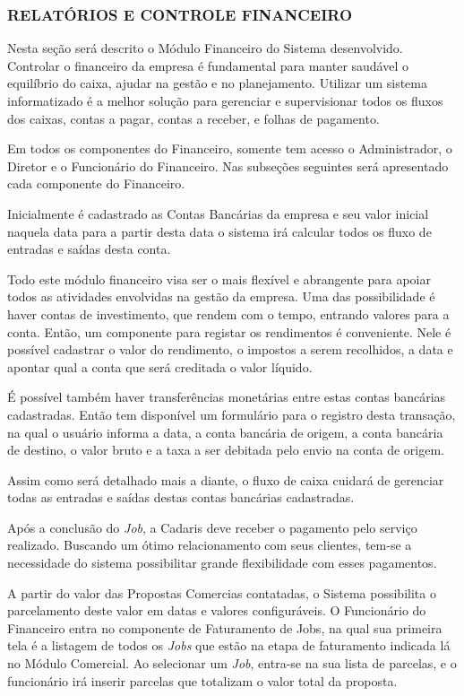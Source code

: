 \documentclass[
  12pt,            %
  openany,
  oneside,
  a4paper,         %
  english,      %
  brazil
]{article}
\numberwithin{figure}{section}
\numberwithin{table}{section}
\newcounter{subsubsubsection}[subsubsection]
\begin{document}
\subsubsection{RELATÓRIOS E CONTROLE FINANCEIRO}

Nesta seção será descrito o Módulo Financeiro do Sistema desenvolvido. Controlar o financeiro da empresa é fundamental para manter saudável o equilíbrio do caixa, ajudar na gestão e no planejamento. Utilizar um sistema informatizado é a melhor solução para gerenciar e supervisionar todos os fluxos dos caixas, contas a pagar, contas a receber, e folhas de pagamento.

Em todos os componentes do Financeiro, somente tem acesso o Administrador, o Diretor e o Funcionário do Financeiro. Nas subseções seguintes será apresentado cada componente do Financeiro.



Inicialmente é cadastrado as Contas Bancárias da empresa e seu valor inicial naquela data para a partir desta data o sistema irá calcular todos os fluxo de entradas e saídas desta conta.

Todo este módulo financeiro visa ser o mais flexível e abrangente para apoiar todos as atividades envolvidas na gestão da empresa. Uma das possibilidade é haver contas de investimento, que rendem com o tempo, entrando valores para a conta. Então, um componente para registar os rendimentos é conveniente. Nele é possível cadastrar o valor do rendimento, o impostos a serem recolhidos, a data e apontar qual a conta que será creditada o valor líquido.

É possível também haver transferências monetárias entre estas contas bancárias cadastradas. Então tem disponível um formulário para o registro desta transação, na qual o usuário informa a data, a conta bancária de origem, a conta bancária de destino, o valor bruto e a taxa a ser debitada pelo envio na conta de origem.

Assim como será detalhado mais a diante, o fluxo de caixa cuidará de gerenciar todas as entradas e saídas destas contas bancárias cadastradas.



Após a conclusão do \textit{Job}, a Cadaris deve receber o pagamento pelo serviço realizado. Buscando um ótimo relacionamento com seus clientes, tem-se a necessidade do sistema possibilitar grande flexibilidade com esses pagamentos.

A partir do valor das Propostas Comercias contatadas, o Sistema possibilita o parcelamento deste valor em datas e valores configuráveis. O Funcionário do Financeiro entra no componente de Faturamento de Jobs, na qual sua primeira tela é a listagem de todos os \textit{Jobs} que estão na etapa de faturamento indicada lá no Módulo Comercial. Ao selecionar um \textit{Job}, entra-se na sua lista de parcelas, e o funcionário irá inserir parcelas que totalizam o valor total da proposta.
\end{document}
